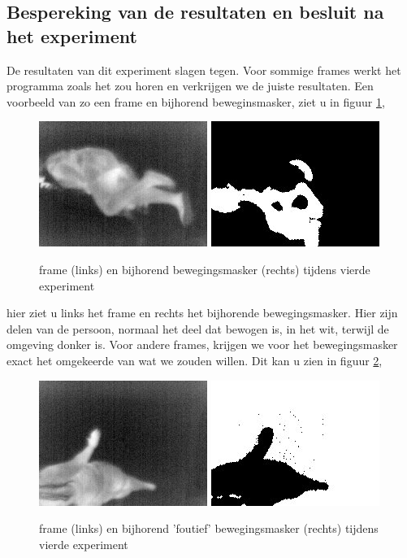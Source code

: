  \subsection{Bespereking van de resultaten en besluit na het experiment}
 \label{ERefRVB}
 De resultaten van dit experiment slagen tegen. Voor sommige frames werkt het programma zoals het zou horen en verkrijgen we de juiste resultaten. Een voorbeeld van zo een frame en bijhorend beweginsmasker, ziet u in figuur \ref{imgRVBJ},
  \begin{figure}[hbp]
  	\includegraphics[scale = 0.75]{VierdeExperiment_frameJuist}
  	\includegraphics[scale = 0.75]{VierdeExperiment_movMaskJuist}
  	\caption{frame (links) en bijhorend bewegingsmasker (rechts) tijdens vierde experiment}
  	\label{imgRVBJ}
  \end{figure}
  hier ziet u links het frame en rechts het bijhorende bewegingsmasker. Hier zijn delen van de persoon, normaal het deel dat bewogen is, in het wit, terwijl de omgeving donker is. Voor andere frames, krijgen we voor het bewegingsmasker exact het omgekeerde van wat we zouden willen. Dit kan u zien in figuur \ref{imgRVB}, 
 \begin{figure}[hbp]
 	\includegraphics[scale = 0.75]{VierdeExperiment_frame}
 	\includegraphics[scale = 0.75]{VierdeExperiment_movMask}
 	\caption{frame (links) en bijhorend 'foutief' bewegingsmasker (rechts) tijdens vierde experiment}
 	\label{imgRVB}
 \end{figure}
